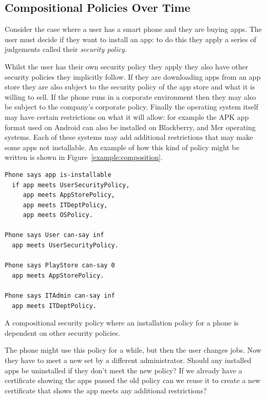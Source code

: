 \documentclass[a4paper,sfsidenotes]{tufte-book}
\begin{document}
\subsection{Compositional Policies Over Time}

Consider the case where a user has a smart phone and they are buying apps.  The
user must decide if they want to install an app: to do this they apply a series
of judgements called their \emph{security policy}.  

Whilst the user has their own security policy they apply they also have other
security policies they implicitly follow.  If they are downloading apps from an
app store they are also subject to the security policy of the app store and what
it is willing to sell.  If the phone runs in a corporate environment then they
may also be subject to the company's corporate policy.  Finally the operating
system itself may have certain restrictions on what it will allow: for example
the APK app format used on Android can also be installed on Blackberry, and Mer
operating systems.  Each of these systems may add additional restrictions that
may make some apps not installable.  An example of how this kind of policy might
be written is shown in Figure~\ref{example:composition}.

\begin{marginfigure}\label{example:composition}
  \begin{lstlisting}[language=SecPAL]
Phone says app is-installable
  if app meets UserSecurityPolicy,
     app meets AppStorePolicy,
     app meets ITDeptPolicy,
     app meets OSPolicy.

Phone says User can-say inf
  app meets UserSecurityPolicy.

Phone says PlayStore can-say 0
  app meets AppStorePolicy.

Phone says ITAdmin can-say inf
  app meets ITDeptPolicy.
  \end{lstlisting}
  \caption{A compositional security policy where an installation policy for a
    phone is dependent on other security policies.}
\end{marginfigure}
     
The phone might use this policy for a while, but then the user changes jobs.
Now they have to meet a new  set by a different administrator.
Should any installed apps be uninstalled if they don't meet the new policy?  If
we already have a certificate showing the apps passed the old policy can we
reuse it to create a new certificate that shows the app meets any additional
restrictions?
\end{document}
